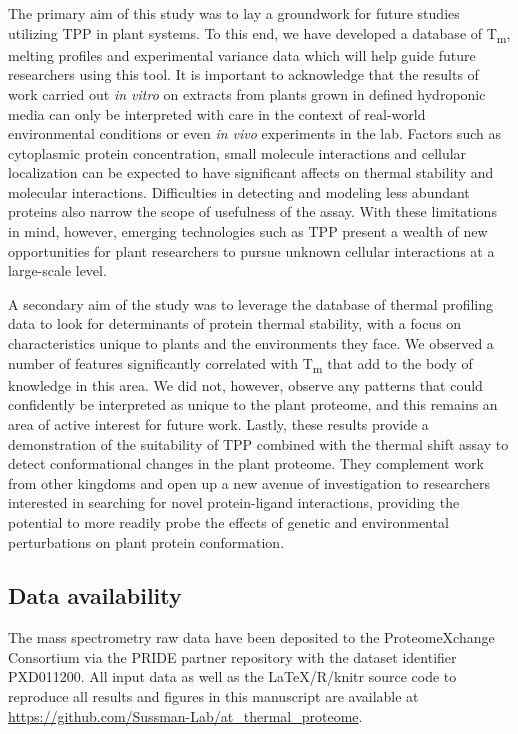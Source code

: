 \documentclass[11pt,letter]{article}\usepackage[]{graphicx}\usepackage[]{color}
\newcommand{\Tm}{T\textsubscript{m}}
\begin{document}
The primary aim of this study was to lay a groundwork for future studies utilizing TPP
in plant systems. To this end, we have developed a database of \Tm{}, melting
profiles and experimental variance data which will help guide future
researchers using this tool. It is important to acknowledge that the results
of work carried out \textit{in vitro} on extracts from plants grown in defined
hydroponic media can only be interpreted with care in the context of
real-world environmental conditions or even \textit{in vivo} experiments in the lab.
Factors such as cytoplasmic protein concentration, small molecule interactions and
cellular localization can be expected to have significant affects on thermal
stability and molecular interactions. Difficulties in detecting and
modeling less abundant proteins also narrow the scope of usefulness of the
assay. With these limitations in mind, however, emerging technologies such as
TPP present a wealth of new opportunities for plant researchers to pursue
unknown cellular interactions at a large-scale level.

A secondary aim of the study was to leverage the database of thermal profiling
data to look for determinants of protein thermal stability, with a focus on
characteristics unique to plants and the environments they face. We observed a
number of features significantly correlated with \Tm{} that add to the body of
knowledge in this area. We did not, however, observe any patterns that could
confidently be interpreted as unique to the plant proteome, and this remains
an area of active interest for future work. Lastly, these results provide a
demonstration of the suitability of TPP combined with the thermal shift assay
to detect conformational changes in the plant proteome. They complement work
from other kingdoms and open up a new avenue of investigation to researchers
interested in searching for novel protein-ligand interactions, providing the
potential to more readily probe the effects of genetic and environmental
perturbations on plant protein conformation.

\subsection*{Data availability}

The mass spectrometry raw data have been deposited to the ProteomeXchange
Consortium via the PRIDE\cite{vizcaino_2016_2016} partner repository with the
dataset identifier PXD011200. All input data as well as the \LaTeX{}/R/knitr
source code to reproduce all results and figures in this manuscript are
available at \url{https://github.com/Sussman-Lab/at_thermal_proteome}.
\end{document}
